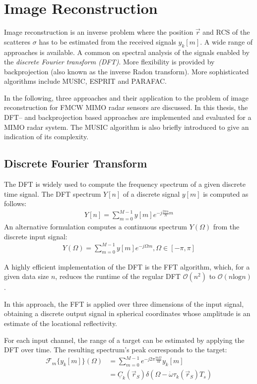 \section{Image Reconstruction}
Image reconstruction is an inverse problem where the position $\vec r$ and RCS of the scatteres $\sigma$
has to be estimated from the received signals $y_k[m]$.
A wide range of approaches is available.
A common on spectral analysis of the signals enabled by the \emph{discrete Fourier transform (DFT)}.
More flexibility is provided by backprojection (also known as the inverse Radon transform).
More sophisticated algorithms include MUSIC, ESPRIT and PARAFAC.

In the following, three approaches and their application to
the problem of image reconstruction for FMCW MIMO radar sensors are discussed.
In this thesis, the DFT-- and backprojection based approaches
are implemented and evaluated for a MIMO radar system.
The MUSIC algorithm is also briefly introduced to give an indication of its complexity.

\subsection{Discrete Fourier Transform}
\label{ssec:dft_imaging_theory}
The DFT is widely used to compute the frequency spectrum of a given discrete time signal.
The DFT spectrum $Y[n]$ of a discrete signal $y[m]$ is computed as follows:
\begin{align}
    Y[n] = \sum_{m=0}^{M-1}y[m]e^{-j\frac{2\pi n}{N}m}
\end{align}
An alternative formulation computes a continuous spectrum $Y(\Omega)$
from the discrete input signal:
\begin{align}
    Y(\Omega) = \sum_{m=0}^{M-1}y[m]e^{-j\Omega m}, \Omega \in [-\pi, \pi]
\end{align}

A highly efficient implementation of the DFT is the FFT algorithm, which,
for a given data size $n$, reduces the runtime of the regular DFT $\mathcal O(n^2)$ to $\mathcal O(n\text{log}n)$ \cite{fft_algorithm}.

In this approach, the FFT is applied over three dimensions of the input signal,
obtaining a discrete output signal in spherical coordinates whose amplitude is an estimate of the locational reflectivity.

For each input channel, the range of a target can be estimated by applying the DFT over time.
The resulting spectrum's peak corresponds to the target:
\begin{align}
    \mathcal{F}_m\{y_k[m]\}(\Omega) & = \sum_{m=0}^{M-1} e^{-j2\pi\frac{m\Omega}{M}} y_k[m]                                       \\
                                    & = \underline C_k(\vec r_S) \delta(\Omega-\dot \omega \tau_k(\vec r_S)T_s) \label{eqn:y_fft}
\end{align}


